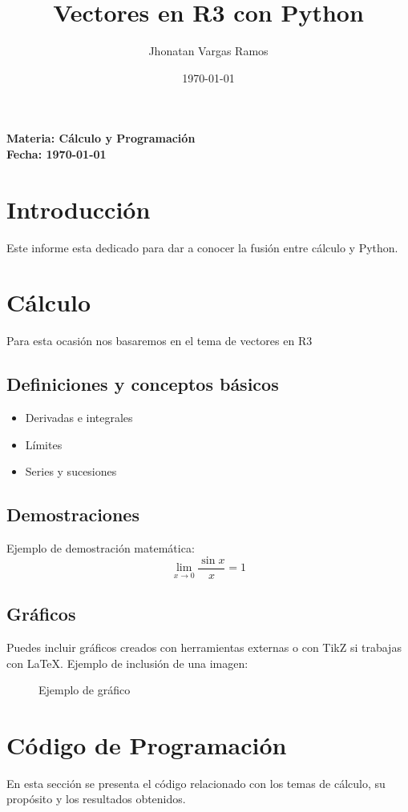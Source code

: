 \documentclass[12pt]{article}
\title{Vectores en R3 con Python}
\author{Jhonatan Vargas Ramos}
\date{\today}
\begin{document}
	
	\maketitle
	\begin{center}
		\textbf{Materia: Cálculo y Programación}\\
		\textbf{Fecha: \today}
	\end{center}
	\newpage
	
	\tableofcontents
	\newpage
	
	\section{Introducción}
	Este informe esta dedicado para dar a conocer la fusión entre cálculo y Python. 
	
	\section{Cálculo}
	Para esta ocasión nos basaremos en el tema de vectores en R3	
	\subsection{Definiciones y conceptos básicos}
	
	\begin{itemize}
		\item Derivadas e integrales
		\item Límites
		\item Series y sucesiones
	\end{itemize}
	
	\subsection{Demostraciones}
	Ejemplo de demostración matemática:
	\[
	\lim_{x \to 0} \frac{\sin x}{x} = 1
	\]
	
	\subsection{Gráficos}
	Puedes incluir gráficos creados con herramientas externas o con TikZ si trabajas con LaTeX. Ejemplo de inclusión de una imagen:
	\begin{figure}[h!]
		\centering
		\caption{Ejemplo de gráfico}
	\end{figure}
	
	\section{Código de Programación}
	En esta sección se presenta el código relacionado con los temas de cálculo, su propósito y los resultados obtenidos.
	
\end{document}
